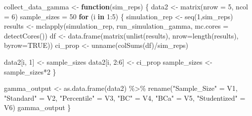 \documentclass[12pt]{article}
\newenvironment{Shaded}{\begin{snugshade}}{\end{snugshade}}
\newcommand{\AttributeTok}[1]{\textcolor[rgb]{0.77,0.63,0.00}{#1}}
\newcommand{\ConstantTok}[1]{\textcolor[rgb]{0.00,0.00,0.00}{#1}}
\newcommand{\ControlFlowTok}[1]{\textcolor[rgb]{0.13,0.29,0.53}{\textbf{#1}}}
\newcommand{\DecValTok}[1]{\textcolor[rgb]{0.00,0.00,0.81}{#1}}
\newcommand{\FunctionTok}[1]{\textcolor[rgb]{0.00,0.00,0.00}{#1}}
\newcommand{\NormalTok}[1]{#1}
\newcommand{\OtherTok}[1]{\textcolor[rgb]{0.56,0.35,0.01}{#1}}
\newcommand{\SpecialCharTok}[1]{\textcolor[rgb]{0.00,0.00,0.00}{#1}}
\newcommand{\StringTok}[1]{\textcolor[rgb]{0.31,0.60,0.02}{#1}}
\begin{document}
\begin{Shaded}
\begin{Highlighting}[]
\NormalTok{collect\_data\_gamma }\OtherTok{\textless{}{-}} \ControlFlowTok{function}\NormalTok{(sim\_reps) \{}
\NormalTok{  data2 }\OtherTok{\textless{}{-}} \FunctionTok{matrix}\NormalTok{(}\AttributeTok{nrow =} \DecValTok{5}\NormalTok{, }\AttributeTok{ncol =} \DecValTok{6}\NormalTok{)}
\NormalTok{  sample\_sizes }\OtherTok{=} \DecValTok{50}
  \ControlFlowTok{for}\NormalTok{ (i }\ControlFlowTok{in} \DecValTok{1}\SpecialCharTok{:}\DecValTok{5}\NormalTok{) \{}
\NormalTok{    simulation\_rep }\OtherTok{\textless{}{-}} \FunctionTok{seq}\NormalTok{(}\DecValTok{1}\NormalTok{,sim\_reps)}
\NormalTok{    results }\OtherTok{\textless{}{-}} \FunctionTok{mclapply}\NormalTok{(simulation\_rep, run\_simulation\_gamma, }\AttributeTok{mc.cores =} \FunctionTok{detectCores}\NormalTok{())}
\NormalTok{    df }\OtherTok{\textless{}{-}} \FunctionTok{data.frame}\NormalTok{(}\FunctionTok{matrix}\NormalTok{(}\FunctionTok{unlist}\NormalTok{(results), }\AttributeTok{nrow=}\FunctionTok{length}\NormalTok{(results), }\AttributeTok{byrow=}\ConstantTok{TRUE}\NormalTok{))}
\NormalTok{    ci\_prop }\OtherTok{\textless{}{-}} \FunctionTok{unname}\NormalTok{(}\FunctionTok{colSums}\NormalTok{(df)}\SpecialCharTok{/}\NormalTok{sim\_reps)}
    
\NormalTok{    data2[i, }\DecValTok{1}\NormalTok{] }\OtherTok{\textless{}{-}}\NormalTok{ sample\_sizes}
\NormalTok{    data2[i, }\DecValTok{2}\SpecialCharTok{:}\DecValTok{6}\NormalTok{] }\OtherTok{\textless{}{-}}\NormalTok{ ci\_prop}
\NormalTok{    sample\_sizes }\OtherTok{\textless{}{-}}\NormalTok{ sample\_sizes}\SpecialCharTok{*}\DecValTok{2}
\NormalTok{  \}}

\NormalTok{  gamma\_output }\OtherTok{\textless{}{-}} \FunctionTok{as.data.frame}\NormalTok{(data2) }\SpecialCharTok{\%\textgreater{}\%} 
    \FunctionTok{rename}\NormalTok{(}\StringTok{"Sample\_Size"} \OtherTok{=}\NormalTok{ V1, }\StringTok{"Standard"} \OtherTok{=}\NormalTok{ V2, }\StringTok{"Percentile"} \OtherTok{=}\NormalTok{ V3, }\StringTok{"BC"} \OtherTok{=}\NormalTok{ V4, }
           \StringTok{"BCa"} \OtherTok{=}\NormalTok{ V5, }\StringTok{"Studentized"} \OtherTok{=}\NormalTok{ V6) }
\NormalTok{  gamma\_output}
\NormalTok{\}}
\end{Highlighting}
\end{Shaded}
\end{document}
